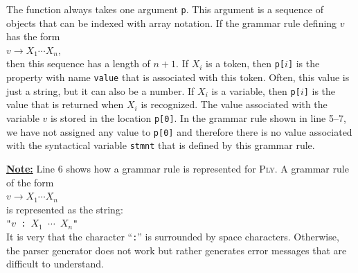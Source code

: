 \begin{enumerate}
      The function always takes one argument \texttt{p}.  This argument is a sequence of objects that can be
      indexed with array notation. If the grammar rule defining $v$ has the form
      \\[0.2cm]
      \hspace*{1.3cm}
      $v \rightarrow X_1 \cdots X_n$,
      \\[0.2cm]
      then this sequence has a length of $n+1$.  If $X_i$ is a token, then \texttt{p[$i$]} is the property
      with name \texttt{value} that is associated with this token.  Often, this value is just a string, but it
      can also be a number.  If $X_i$ is a variable, then  \texttt{p[$i$]} is the value that is returned
      when $X_i$ is recognized.  The value associated with the variable $v$ is stored in the location
      \texttt{p[0]}.  In the grammar rule shown in line 5--7, we have not assigned any value to \texttt{p[0]} and
      therefore there is no value associated with the syntactical variable \texttt{stmnt} that is defined by
      this grammar rule.

      \underline{\textbf{Note:}} Line 6 shows how a grammar rule is represented for \textsc{Ply}.
      A grammar rule of the form 
      \\[0.2cm]
      \hspace*{1.3cm}
      $v \rightarrow X_1 \cdots X_n$
      \\[0.2cm]
      is represented as the string:
      \\[0.2cm]
      \hspace*{1.3cm}
      \texttt{"$v$ : $X_1$ $\cdots$ $X_n$"}
      \\[0.2cm]
      It is very  that the character ``\texttt{:}'' is
      surrounded by space characters.  Otherwise, the parser generator does not work but rather generates error
      messages that are difficult to understand. 


\end{enumerate}
